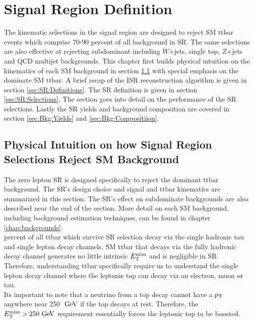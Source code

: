 
\chapter{Signal Region Definition}
\label{chap:SignalRegion}

\indent The kinematic selections in the signal region are designed to reject SM ttbar events which comprise 70-90 percent of all background in SR.  The same selections are also effective at rejecting subdominant including $W$+jets, single top, $Z$+jets and QCD multijet backgrounds.  This chapter first builds physical intuition on the kinematics of each SM background in section \ref{sec:SR:physical} with special emphasis on the dominate SM ttbar.  A brief recap of the ISR reconstruction algorithm is given in section \ref{sec:SR:Definitions}.  The SR definition is given in section \ref{sec:SR:Selections}.  The section goes into detail on the performance of the SR selections. Lastly the SR yields and background composition are covered in section \ref{sec:Bkg:Yields} and \ref{sec:Bkg:Compositiion}.  \\

\section{Physical Intuition on how Signal Region Selections Reject SM Background}
\label{sec:SR:physical}

\indent The zero lepton SR is designed specifically to reject the dominant ttbar background.  The SR's design choice and signal and ttbar kinematics are summarized in this section.  The SR's effect on subdominate backgrounds are also described near the end of the section. More detail on each SM background, including background estimation techniques, can be found in chapter \ref{chap:backgrounds}. \\

 percent of all ttbar which survive SR selection decay via the single hadronic tau and single lepton decay channels.  SM ttbar that decays via the fully hadronic decay channel generates no little intrinsic $E_{\mathrm{T}}^{\mathrm{miss}}$ and is negligible in SR.  Therefore, understanding ttbar specifically require us to understand the single lepton decay channel where the leptonic top can decay via an electron, muon or tau. \\

\indent Its important to note that a neutrino from a top decay cannot have a $p_{\mathrm{T}}$ anywhere near 250 $\gev$ if the top decays at rest.  Therefore, the $\MET > 250 \gev$ requirement essentially forces the leptonic top to be boosted.   \\

